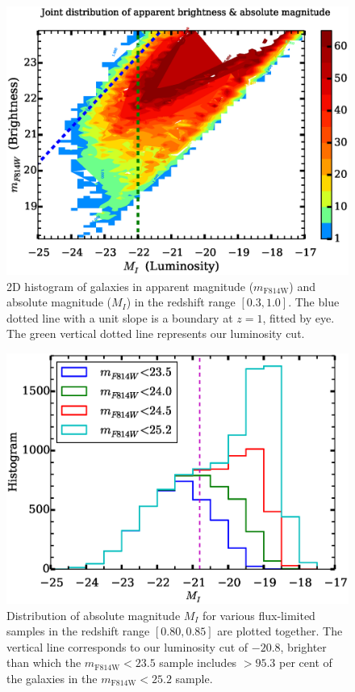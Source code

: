 \documentclass[twocolumn,useAMS,usenatbib]{mn2e}
\begin{document}
\begin{figure}
  \centering
   \includegraphics[width=1.0\columnwidth]{hist2d_mag_mi}
   \caption{2D histogram of galaxies in apparent magnitude
     ($m_\text{F814W}$) and absolute magnitude ($M_I$) in the redshift range $[0.3, 1.0]$. The blue dotted line with a unit slope is a boundary at $z=1$, fitted by eye.
     The green vertical dotted line represents our luminosity cut. } 
   \label{fig:2Dhist}
\end{figure}

\begin{figure}
  \centering
   \includegraphics[width=\columnwidth]{MAG_histograms}
   \caption{Distribution of absolute magnitude $M_I$ for various
     flux-limited samples in the redshift range $[0.80, 0.85]$ are plotted together. The vertical line
     corresponds to our luminosity cut of $-20.8$, brighter than which
     the $m_\text{F814W}<23.5$ sample includes $>95.3$ per cent of the
     galaxies in the $m_\text{F814W}<25.2$ sample.
   }
   \label{fig:MIhist}
 \end{figure}
\end{document}

